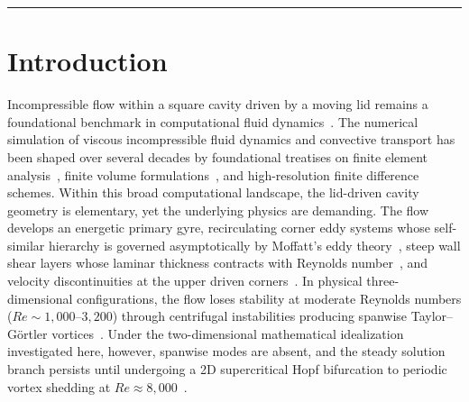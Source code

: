\documentclass[11pt,a4paper]{article}
\begin{document}
\vspace{1em}
\hrule
\vspace{1em}

\section{Introduction}
Incompressible flow within a square cavity driven by a moving lid remains a foundational benchmark in computational fluid dynamics~\cite{ghia1982high,erturk2005numerical,bruneau20062d,hou1995lattice}. The numerical simulation of viscous incompressible fluid dynamics and convective transport has been shaped over several decades by foundational treatises on finite element analysis~\cite{lewis1996finite,lewis1998porous,lewis2004fundamentals,lewis2016fundamentals}, finite volume formulations~\cite{patankar1980numerical}, and high-resolution finite difference schemes. Within this broad computational landscape, the lid-driven cavity geometry is elementary, yet the underlying physics are demanding. The flow develops an energetic primary gyre, recirculating corner eddy systems whose self-similar hierarchy is governed asymptotically by Moffatt's eddy theory~\cite{moffatt1964viscous}, steep wall shear layers whose laminar thickness contracts with Reynolds number~\cite{prandtl1904uber,schlichting2000boundary}, and velocity discontinuities at the upper driven corners~\cite{botella1998benchmark,bruneau20062d}. In physical three-dimensional configurations, the flow loses stability at moderate Reynolds numbers ($Re \sim 1{,}000\text{--}3{,}200$) through centrifugal instabilities producing spanwise Taylor--G\"ortler vortices~\cite{koseff1984hydrothermal,aidun1991primary,albensoeder2001three}. Under the two-dimensional mathematical idealization investigated here, however, spanwise modes are absent, and the steady solution branch persists until undergoing a 2D supercritical Hopf bifurcation to periodic vortex shedding at $Re \approx 8{,}000$~\cite{shen1991hopf,peng2003transition,bruneau20062d}.
\end{document}
